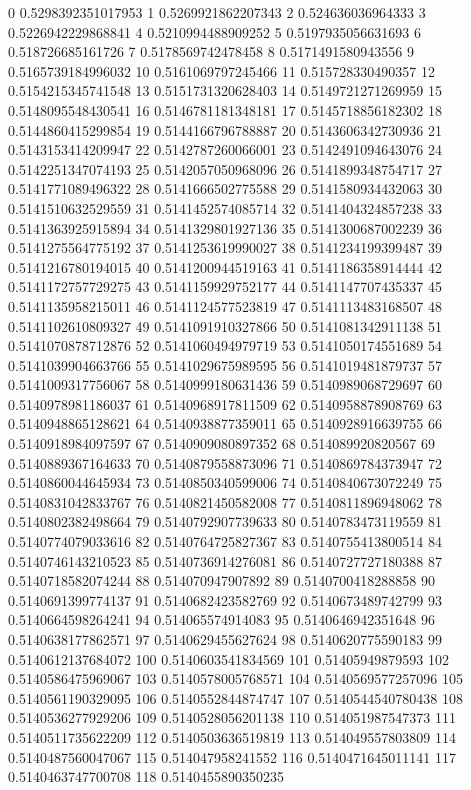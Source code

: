 0 0.5298392351017953
1 0.5269921862207343
2 0.524636036964333
3 0.5226942229868841
4 0.5210994488909252
5 0.5197935056631693
6 0.518726685161726
7 0.5178569742478458
8 0.5171491580943556
9 0.5165739184996032
10 0.5161069797245466
11 0.515728330490357
12 0.5154215345741548
13 0.5151731320628403
14 0.5149721271269959
15 0.5148095548430541
16 0.5146781181348181
17 0.5145718856182302
18 0.5144860415299854
19 0.5144166796788887
20 0.5143606342730936
21 0.5143153414209947
22 0.5142787260066001
23 0.5142491094643076
24 0.5142251347074193
25 0.5142057050968096
26 0.5141899348754717
27 0.5141771089496322
28 0.5141666502775588
29 0.5141580934432063
30 0.5141510632529559
31 0.5141452574085714
32 0.5141404324857238
33 0.5141363925915894
34 0.5141329801927136
35 0.5141300687002239
36 0.5141275564775192
37 0.5141253619990027
38 0.5141234199399487
39 0.5141216780194015
40 0.5141200944519163
41 0.5141186358914444
42 0.5141172757729275
43 0.5141159929752177
44 0.5141147707435337
45 0.5141135958215011
46 0.5141124577523819
47 0.5141113483168507
48 0.5141102610809327
49 0.5141091910327866
50 0.5141081342911138
51 0.5141070878712876
52 0.5141060494979719
53 0.5141050174551689
54 0.5141039904663766
55 0.5141029675989595
56 0.5141019481879737
57 0.5141009317756067
58 0.5140999180631436
59 0.5140989068729697
60 0.5140978981186037
61 0.5140968917811509
62 0.5140958878908769
63 0.5140948865128621
64 0.5140938877359011
65 0.5140928916639755
66 0.5140918984097597
67 0.5140909080897352
68 0.514089920820567
69 0.5140889367164633
70 0.5140879558873096
71 0.5140869784373947
72 0.5140860044645934
73 0.5140850340599006
74 0.5140840673072249
75 0.5140831042833767
76 0.5140821450582008
77 0.5140811896948062
78 0.5140802382498664
79 0.5140792907739633
80 0.5140783473119559
81 0.5140774079033616
82 0.5140764725827367
83 0.5140755413800514
84 0.5140746143210523
85 0.5140736914276081
86 0.5140727727180388
87 0.5140718582074244
88 0.514070947907892
89 0.5140700418288858
90 0.5140691399774137
91 0.5140682423582769
92 0.5140673489742799
93 0.5140664598264241
94 0.514065574914083
95 0.5140646942351648
96 0.5140638177862571
97 0.5140629455627624
98 0.5140620775590183
99 0.5140612137684072
100 0.5140603541834569
101 0.51405949879593
102 0.5140586475969067
103 0.5140578005768571
104 0.5140569577257096
105 0.5140561190329095
106 0.5140552844874747
107 0.5140544540780438
108 0.5140536277929206
109 0.5140528056201138
110 0.514051987547373
111 0.5140511735622209
112 0.5140503636519819
113 0.514049557803809
114 0.5140487560047067
115 0.514047958241552
116 0.5140471645011141
117 0.5140463747700708
118 0.5140455890350235

